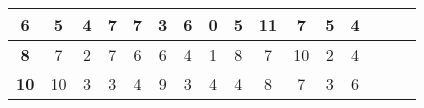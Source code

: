 \begin{table*}[!htb]
\begin{tabular}{|c|c|c|c|c|c|c|c|c|c|c|c|c|c|c|c|}
		\textbf{6}                   & 5                             & 4                              & 7                  & 7                              & 3                            & 6     & 0                            & 5                             & 11                        & 7                             & 5                       & 4                   \\ \hline
		\textbf{8}                   & 7                             & 2                              & 7                   & 6                              & 6                            & 4       & 1                            & 8                             & 7            & 10                            & 2                       & 4                   \\ \hline
		\textbf{10}                  & 10                            & 3                              & 3                  & 4                              & 9                            & 3 	     & 4                            & 4                             & 8                          & 7                             & 3                       & 6                   \\ \hline   
	\end{tabular}
\end{table*}



